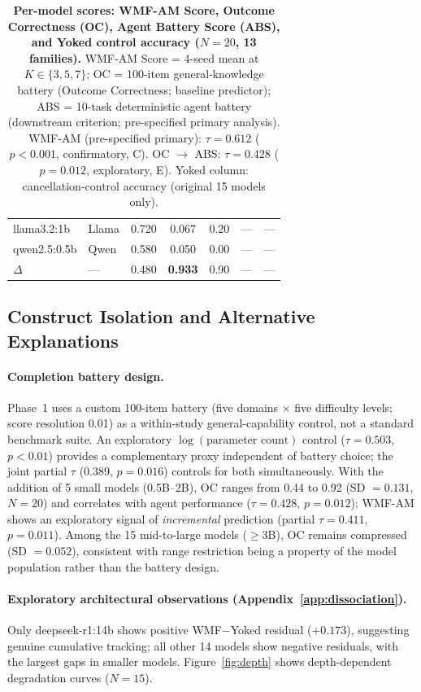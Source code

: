 \documentclass{article}
\begin{document}
\begin{table}[t]
{\begin{tabular}{llccccc}
llama3.2:1b     & Llama    & 0.720 & 0.067 & 0.20 & --- & --- \\
qwen2.5:0.5b    & Qwen     & 0.580 & 0.050 & 0.00 & --- & --- \\
\midrule
$\Delta$ & — & 0.480 & \textbf{0.933} & 0.90 & — & — \\
\bottomrule
\end{tabular}}
\caption{\textbf{Per-model scores: WMF-AM Score, Outcome Correctness (OC),
Agent Battery Score (ABS), and Yoked control accuracy ($N{=}20$, 13 families).}
WMF-AM Score = 4-seed mean at $K\in\{3,5,7\}$; OC = 100-item general-knowledge
battery (Outcome Correctness; baseline predictor); ABS = 10-task deterministic
agent battery (downstream criterion; pre-specified primary analysis).
WMF-AM (pre-specified primary): $\tau{=}0.612$ ($p{<}0.001$, confirmatory, C).
OC $\to$ ABS: $\tau{=}0.428$ ($p{=}0.012$, exploratory, E).
Yoked column: cancellation-control accuracy (original 15 models only).}
\label{tab:pilot}
\end{table}

\subsection{Construct Isolation and Alternative Explanations}
\label{sec:robustness}

\paragraph{Completion battery design.}
Phase~1 uses a custom 100-item battery (five domains $\times$ five difficulty
levels; score resolution 0.01) as a within-study general-capability control,
not a standard benchmark suite. An exploratory $\log(\text{parameter count})$
control ($\tau = 0.503$, $p < 0.01$) provides a complementary proxy
independent of battery choice; the joint partial $\tau$ ($0.389$,
$p = 0.016$) controls for both simultaneously.
With the addition of 5 small models (0.5B--2B), OC ranges from
0.44 to 0.92 (SD $= 0.131$, $N{=}20$) and correlates with agent
performance ($\tau = 0.428$, $p = 0.012$); WMF-AM shows an exploratory
signal of \emph{incremental} prediction (partial $\tau = 0.411$,
$p = 0.011$).
Among the 15 mid-to-large models ($\geq$3B), OC remains compressed
(SD $= 0.052$), consistent with range restriction being a property of
the model population rather than the battery design.

{\sloppy
\paragraph{Exploratory architectural observations (Appendix~\ref{app:dissociation}).}
Only deepseek-r1:14b shows positive WMF$-$Yoked residual ($+0.173$),
suggesting genuine cumulative tracking; all other 14 models show negative
residuals, with the largest gaps in smaller models.
Figure~\ref{fig:depth} shows depth-dependent degradation curves ($N{=}15$).
\par}
\end{document}
